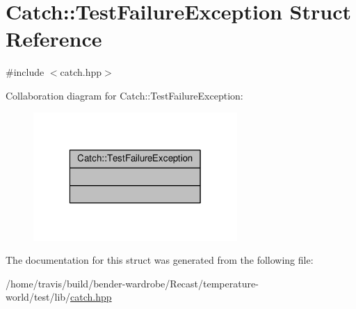 \hypertarget{struct_catch_1_1_test_failure_exception}{\section{Catch\-:\-:Test\-Failure\-Exception Struct Reference}
\label{struct_catch_1_1_test_failure_exception}
}


{\ttfamily \#include $<$catch.\-hpp$>$}



Collaboration diagram for Catch\-:\-:Test\-Failure\-Exception\-:
\nopagebreak
\begin{figure}[H]
\begin{center}
\leavevmode
\includegraphics[width=220pt]{struct_catch_1_1_test_failure_exception__coll__graph}
\end{center}
\end{figure}


The documentation for this struct was generated from the following file\-:\begin{DoxyCompactItemize}
\item 
/home/travis/build/bender-\/wardrobe/\-Recast/temperature-\/world/test/lib/\hyperlink{catch_8hpp}{catch.\-hpp}\end{DoxyCompactItemize}
